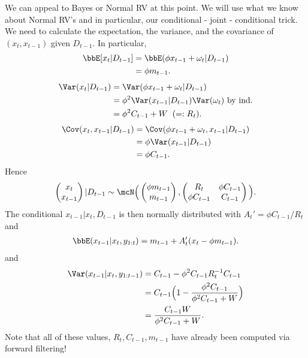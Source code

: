 \documentclass{article}
\begin{document}
We can appeal to Bayes or Normal RV at this point.  We will use what we know about Normal RV's and in particular, our conditional - joint - conditional trick.  We need to calculate the expectation, the variance, and the covariance of $(x_t, x_{t-1})$ given $D_{t-1}$.  In particular, 
\begin{align*}
\bbE[ x_t | D_{t-1} ] 
& = \bbE( \phi x_{t-1} + \omega_t | D_{t-1} ) \\
& = \phi m_{t-1}.
\end{align*}
\begin{align*}
\Var(x_t | D_{t-1}) 
& = \Var(\phi x_{t-1} + \omega_t | D_{t-1}) \\
& = \phi^2 \Var (x_{t-1} | D_{t-1}) \Var(\omega_t) \textmd{ by ind.} \\
& = \phi^2 C_{t-1} + W \;\; (= : R_t).
\end{align*}
\begin{align*}
\Cov (x_t, x_{t-1} | D_{t-1} ) 
& = \Cov( \phi x_{t-1} + \omega_t, x_{t-1} | D_{t-1} ) \\
& = \phi \Var( x_{t-1} | D_{t-1} ) \\
& = \phi C_{t-1}.
\end{align*}
Hence
\[
\begin{pmatrix}
x_{t} \\
x_{t-1}
\end{pmatrix} | D_{t-1} 
\sim
\mcN
\Big(
\begin{pmatrix}
\phi m_{t-1} \\
m_{t-1}
\end{pmatrix} ,
\begin{pmatrix}
R_t & \phi C_{t-1} \\
\phi C_{t-1} & C_{t-1}
\end{pmatrix}
\Big).
\]
The conditional $x_{t-1} | x_t, D_{t-1}$ is then normally distributed with $A_t'= \phi C_{t-1} / R_t$ and
\begin{align*}
\bbE( x_{t-1} | x_t, y_{1:t} ) = m_{t-1} + A_t' (x_t - \phi m_{t-1}).
\end{align*}
and
\begin{align*}
\Var(x_{t-1} | x_t, y_{1:t-1}) 
& = C_{t-1} - \phi^2 C_{t-1} R^{-1}_t C_{t-1} \\
& = C_{t-1} \Big( 1 - \frac{\phi^2 C_{t-1} }{\phi^2 C_{t-1} + W} \Big) \\
& = \frac{C_{t-1} W}{\phi^2 C_{t-1} + W}.
\end{align*}
Note that all of these values, $R_t, C_{t-1}, m_{t-1}$ have already been computed via forward filtering!
\end{document}
